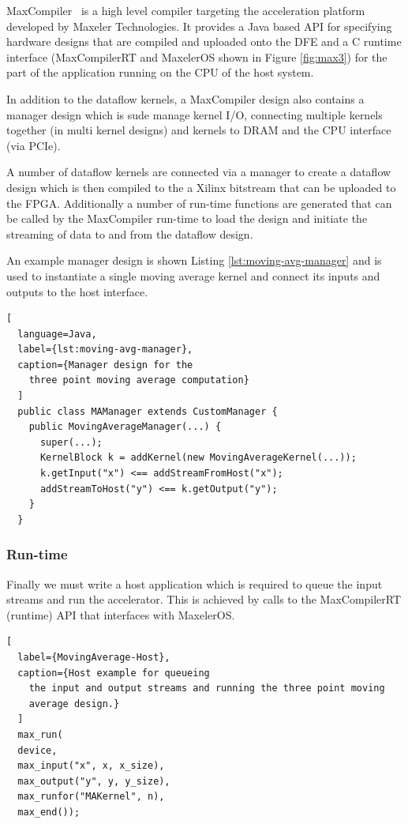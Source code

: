 \label{sec:back-maxcompiler}

MaxCompiler~\cite{5719584} is a high level compiler targeting the
acceleration platform developed by Maxeler Technologies. It provides a
Java based API for specifying hardware designs that are compiled and
uploaded onto the DFE and a C runtime interface (MaxCompilerRT and
MaxelerOS shown in Figure \ref{fig:max3}) for the part of the
application running on the CPU of the host system.

In addition to the dataflow kernels, a MaxCompiler design also
contains a manager design which is sude manage kernel I/O, connecting
multiple kernels together (in multi kernel designs) and kernels to
DRAM and the CPU interface (via PCIe).

A number of dataflow kernels are connected via a manager to create a
dataflow design which is then compiled to the a Xilinx bitstream that
can be uploaded to the FPGA. Additionally a number of run-time
functions are generated that can be called by the MaxCompiler run-time
to load the design and initiate the streaming of data to and from the
dataflow design.

An example manager design is shown Listing
\ref{lst:moving-avg-manager} and is used to instantiate a single
moving average kernel and connect its inputs and outputs to the host
interface.

\begin{lstlisting}[
  language=Java,
  label={lst:moving-avg-manager},
  caption={Manager design for the
    three point moving average computation}
  ]
  public class MAManager extends CustomManager {
    public MovingAverageManager(...) {
      super(...);
      KernelBlock k = addKernel(new MovingAverageKernel(...));
      k.getInput("x") <== addStreamFromHost("x");
      addStreamToHost("y") <== k.getOutput("y");
    }
  }
\end{lstlisting}

\subsubsection{Run-time}
Finally we must write a host application which is required to queue
the input streams and run the accelerator. This is achieved by calls
to the MaxCompilerRT (runtime) API that interfaces with MaxelerOS.

\begin{lstlisting}[
  label={MovingAverage-Host},
  caption={Host example for queueing
    the input and output streams and running the three point moving
    average design.}
  ]
  max_run(
  device,
  max_input("x", x, x_size),
  max_output("y", y, y_size),
  max_runfor("MAKernel", n),
  max_end());
\end{lstlisting}

